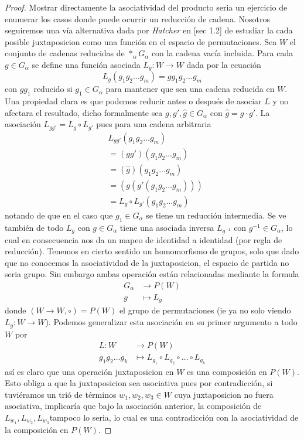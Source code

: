 \begin{proof}
  Mostrar directamente la asociatividad del producto seria un ejercicio
  de enumerar los casos donde puede ocurrir un reducción de cadena.
  Nosotros seguiremos una vía alternativa dada por \emph{Hatcher} en
  \cite{Hatcher}[sec 1.2] de estudiar la cada posible juxtaposicion como
  una función en el espacio de permutaciones. Sea \(W\) el conjunto de
  cadenas reducidas de \(*_\alpha G_\alpha\) con la cadena vacía
  incluida. Para cada \(g \in G_\alpha\) se define una función asociada
  \(L _g : W \to W\) dada por la ecuación
  \[ L_g \left( g_1 g_2 \dots g_m \right) = g g_1 g_2 \dots g_m \]
  con \(g g_1\) reducido si \(g_1 \in G_\alpha \) para mantener que sea
  una cadena reducida en \(W\). Una propiedad clara es que podemos
  reducir antes o después de asociar \(L\) y no afectara el resultado,
  dicho formalmente sea \(g, g', \hat g \in G_\alpha\) con \(\hat g = g
  \cdot g'\). La asociación \(L_{g g'} = L_{g} \circ L_{g'}\) pues para
  una cadena arbitraria
  \begin{align*}
    &L_{g g'} \left( g_1 g_2 \dots g_m \right) \\
    &= (g g') (g_1 g_2 \dots g_m) \\
    &= (\hat g) (g_1 g_2 \dots g_m) \\
    &= (g (g' (g_1 g_2 \dots g_m))) \\
    &= L_g \circ L_{g'} \left( g_1 g_2 \dots g_m \right)
  \end{align*}
  notando de que en el caso que \(g_1 \in G_\alpha\) se tiene un
  reducción intermedia. Se ve también de todo \(L_g\) con \(g \in
  G_\alpha\) tiene una asociada inversa \(L_{g^{-1}}\) con \(g^{-1} \in
  G_\alpha\), lo cual en consecuencia nos da un mapeo de identidad a
  identidad (por regla de reducción). Tenemos en cierto sentido un
  homomorfismo de grupos, solo que dado que no conocemos la
  asociatividad de la juxtaposicion, el espacio de partida no seria
  grupo. Sin embargo ambas operación están relacionadas mediante la
  formula
  \begin{align*}
    G_\alpha &\longrightarrow P(W) \\
    g &\longmapsto L_g
  \end{align*}
  donde \(\left( W \to W , \circ \right) = P(W)\) el grupo de
  permutaciones (ie ya no solo viendo \(L_g : W \to W\)). Podemos
  generalizar esta asociación en su primer argumento a todo \(W\) por
  \begin{align*}
    L : W &\longrightarrow P(W) \\
    g_1 g_2 \dots g_k &\longmapsto L_{g_1} \circ L_{g_2} \circ \dots
    \circ L_{g_k}
  \end{align*}
  así es claro que una operación juxtaposicion en \(W\) es una
  composición en \(P(W)\). Esto obliga a que la juxtaposicion sea
  asociativa pues por contradicción, si tuviéramos un trió de términos
  \(w_1, w_2, w_3 \in W\) cuya juxtaposicion no fuera asociativa, implicaría
  que bajo la asociación anterior, la composición de \(L_{w_1}, L_{w_2},
  L_{w_3}\)tampoco lo seria, lo cual es una contradicción con la
  asociatividad de la composición en \(P(W)\).
\end{proof}


